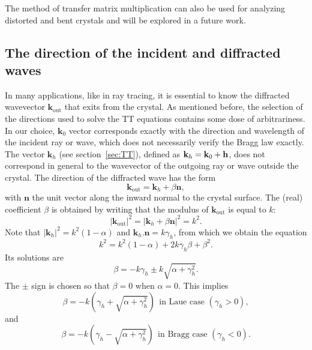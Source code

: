 \documentclass[preprint]{iucr}              %
\newcommand{\inblue}[1]{{\color{blue}#1}}
\begin{document}
 The method of transfer matrix multiplication can also be used for analyzing distorted and bent crystals and will be explored in a future work.
 
\subsection{The direction of the incident and diffracted waves}\label{sec:directions}

In many applications, like in ray tracing, it is essential to know the \inblue{diffracted} wavevector $\textbf{k}_{\text{out}}$ that exits from the crystal. As mentioned before, the selection of the directions used to solve the TT equations contains some dose of arbitrariness. In our choice, $\textbf{k}_0$ vector corresponds exactly with the direction and wavelength of the incident ray or wave, which does not necessarily verify the Bragg law exactly.
The vector $\textbf{k}_h$ (see section~\ref{sec:TT}), defined  as $\textbf k_h=\textbf k_0 + \textbf h$, does not \inblue{correspond in general to} the wavevector of the outgoing ray or wave outside the crystal. The direction of the diffracted wave has the form 
\begin{equation}
    \textbf{k}_{\text{out}} = \textbf{k}_h + \beta \textbf{n}, \nonumber
\end{equation}
with $\textbf{n}$ the unit vector along the inward normal to the crystal surface. The (real) coefficient $\beta$ is obtained by writing that the modulus of $\textbf{k}_{\text{out}}$ is equal to $k$:
\begin{equation}
    |\textbf{k}_{\text{out}}|^2 = |\textbf{k}_h + \beta \textbf{n}|^2=k^2. \nonumber
\end{equation}
Note that $|\textbf{k}_h|^2=k^2(1-\alpha)$ and $\textbf{k}_h . \textbf{n} = k \gamma_h$, from which we obtain the equation
\begin{equation}
    k^2 = k^2(1-\alpha) + 2 k \gamma_h \beta + \beta^2. \nonumber
\end{equation}
Its solutions are
\begin{equation}
    \beta = - k \gamma_h \pm k \sqrt{\alpha + \gamma_h^2}. \nonumber
\end{equation}
The $\pm$ sign is chosen so that $\beta=0$ when $\alpha=0$. This implies 
\begin{equation}
    \beta = - k \left( \gamma_h  + \sqrt{\alpha + \gamma_h^2} \right)~~\text{in Laue case } (\gamma_h > 0), \nonumber
\end{equation}
and
\begin{equation}
    \beta = - k \left( \gamma_h  - \sqrt{\alpha + \gamma_h^2} \right) ~~\text{in Bragg case } (\gamma_h < 0). \nonumber
\end{equation}
\end{document}

